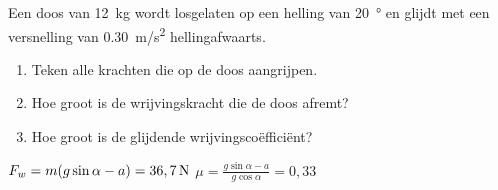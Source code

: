 
\begin{exercise}




 Een doos van \SI{12}{kg} wordt losgelaten op een helling van \SI{20}{\degree} en glijdt met een versnelling van \SI{0,30}{m/s^2} hellingafwaarts. 
\begin{enumerate}
	\item{}Teken alle krachten die op de doos aangrijpen.
	\item{}Hoe groot is de wrijvingskracht die de doos afremt?
  	\item{}Hoe groot is de glijdende wrijvingsco\"effici\"ent?
\end{enumerate}
\begin{oplossing}
$F_w=m(g\sin{\alpha}-a)=36,7\rm\,N$ 
\newline
$\mu=\frac{g\sin{\alpha}-a}{g\cos{\alpha}}=0,33$
\end{oplossing}

\end{exercise}
